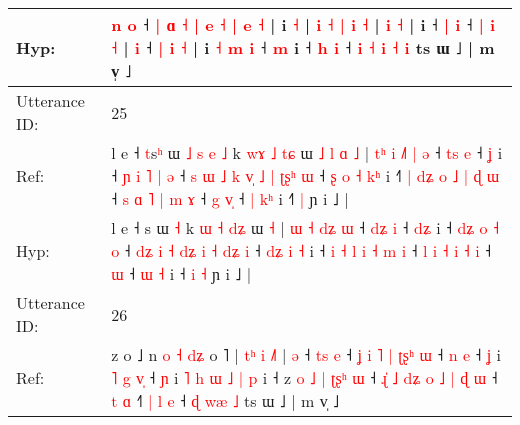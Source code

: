 \documentclass[10pt]{article}
\DeclareRobustCommand{\hl}[1]{{\textcolor{red}{#1}}}
\begin{document}
\begin{longtable}{ll}
 \\
Hyp: & \hl{n} \hl{o} ˧\hl{}\hl{}\hl{}\hl{}\hl{}\hl{} \hl{|} \hl{}\hl{ɑ} \hl{˧} \hl{}\hl{|} \hl{e} \hl{˧} \hl{|} \hl{e} \hl{˧} |\hl{}\hl{}\hl{} i \hl{}\hl{˧} |\hl{}\hl{} \hl{}\hl{i} \hl{˧} \hl{|} \hl{i} \hl{}\hl{˧} |\hl{}\hl{}\hl{} \hl{i} \hl{˧} |\hl{}\hl{}\hl{} i ˧ \hl{|} \hl{i} ˧ \hl{}\hl{|} \hl{i} \hl{˧} |\hl{}\hl{}\hl{}\hl{} \hl{i} ˧\hl{}\hl{}\hl{}\hl{}\hl{} \hl{}\hl{|} \hl{i} \hl{˧} |\hl{}\hl{}\hl{} i\hl{}\hl{}\hl{} \hl{˧} \hl{m} \hl{i} ˧ \hl{m} i ˧ \hl{h} \hl{i} ˧\hl{}\hl{}\hl{}\hl{} \hl{i} \hl{˧} \hl{i} \hl{˧} \hl{i} ts ɯ ˩ | m v̩ ˩
 \\
\midrule
Utterance ID: & 25 \\
Ref: & l e ˧ \hl{t}s\hl{ʰ} ɯ\hl{ }\hl{˩}\hl{ }\hl{s}\hl{ }\hl{e} \hl{˩} k \hl{w}\hl{ɤ} \hl{˩} \hl{t}\hl{ɕ} ɯ\hl{ }\hl{˩}\hl{ }\hl{l}\hl{ }\hl{ɑ} \hl{˩} | \hl{t}\hl{ʰ} \hl{i} \hl{˩}\hl{˥}\hl{ }\hl{|} \hl{ə} ˧ \hl{t}\hl{s} \hl{e} ˧ \hl{}\hl{ʝ} i ˧ \hl{ɲ}\hl{ }\hl{i} \hl{˥} \hl{|} \hl{ə} ˧ \hl{s}\hl{ }\hl{ɯ} \hl{˩} \hl{k} \hl{v}\hl{̩} \hl{˩} \hl{|} \hl{ʈ}\hl{ʂ}\hl{ʰ} \hl{ɯ} ˧ \hl{ʂ}\hl{ }\hl{o} \hl{˧} \hl{k}\hl{ʰ} i ˧\hl{˥} \hl{|} \hl{d}\hl{ʑ} \hl{o} \hl{˩} \hl{|} \hl{ɖ} \hl{ɯ} ˧ \hl{s} \hl{ɑ} \hl{˥} \hl{|} \hl{m} \hl{ɤ} ˧\hl{ }\hl{g} \hl{v}\hl{̩} ˧ \hl{|} \hl{k}\hl{ʰ} i ˧\hl{}\hl{˥} \hl{|} ɲ i ˩ |
 \\
Hyp: & l e ˧ \hl{}s\hl{} ɯ\hl{}\hl{}\hl{}\hl{}\hl{}\hl{} \hl{˧} k \hl{}\hl{ɯ} \hl{˧} \hl{d}\hl{ʑ} ɯ\hl{}\hl{}\hl{}\hl{}\hl{}\hl{} \hl{˧} | \hl{}\hl{ɯ} \hl{˧} \hl{}\hl{}\hl{d}\hl{ʑ} \hl{ɯ} ˧ \hl{d}\hl{ʑ} \hl{i} ˧ \hl{d}\hl{ʑ} i ˧ \hl{}\hl{d}\hl{ʑ} \hl{o} \hl{˧} \hl{o} ˧ \hl{}\hl{d}\hl{ʑ} \hl{i} \hl{˧} \hl{d}\hl{ʑ} \hl{i} \hl{˧} \hl{}\hl{d}\hl{ʑ} \hl{i} ˧ \hl{}\hl{d}\hl{ʑ} \hl{i} \hl{}\hl{˧} i ˧\hl{} \hl{i} \hl{}\hl{˧} \hl{l} \hl{i} \hl{˧} \hl{m} \hl{i} ˧ \hl{l} \hl{i} \hl{˧} \hl{i} \hl{˧} \hl{i} ˧\hl{}\hl{} \hl{}\hl{ɯ} ˧ \hl{ɯ} \hl{}\hl{˧} i ˧\hl{ }\hl{i} \hl{˧} ɲ i ˩ |
 \\
\midrule
Utterance ID: & 26 \\
Ref: & z o ˩ n\hl{ }\hl{o}\hl{ }\hl{˧}\hl{ }\hl{d}\hl{ʑ} o ˥ |\hl{ }\hl{t}\hl{ʰ} \hl{i} \hl{˩}\hl{˥} | \hl{ə} ˧ \hl{t}\hl{s} \hl{e} ˧ \hl{ʝ}\hl{ }\hl{i} \hl{˥} \hl{|} \hl{ʈ}\hl{ʂ}\hl{ʰ} \hl{ɯ} ˧ \hl{n} \hl{e} ˧ \hl{ʝ} i \hl{˥} \hl{g} \hl{v}\hl{̩} ˧ \hl{ɲ} i\hl{ }\hl{˥} \hl{h} \hl{ɯ} \hl{˩} \hl{|} \hl{p} i ˧ z\hl{ }\hl{o} \hl{˩} \hl{|} \hl{ʈ}\hl{ʂ}\hl{ʰ} \hl{ɯ} ˧ \hl{ɻ}\hl{̍} \hl{˩} \hl{d}\hl{ʑ} \hl{o} \hl{˩} \hl{|} \hl{ɖ} \hl{ɯ} ˧ \hl{t} \hl{ɑ} ˧\hl{˥}\hl{ }\hl{|}\hl{ }\hl{l} \hl{e} ˧\hl{ }\hl{ɖ} \hl{w}\hl{æ} \hl{˩} ts ɯ ˩ | m v̩ ˩
 \\

\end{longtable}
\end{document}
